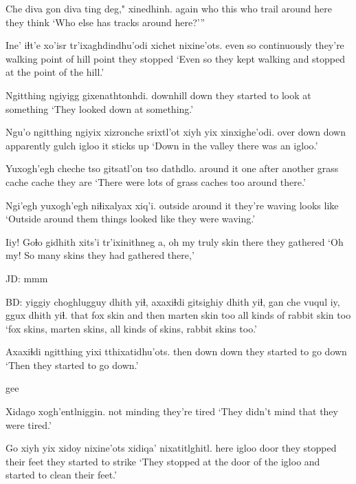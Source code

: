 \documentclass[12pt]{article}
\begin{document}
\gll Che   diva gon  diva ting  deg,"       xinedhinh.
again who  this who  trail {around here} {they think}
\glt `Who else has tracks around here?'''
\glend

\gll Ine'    iɬt'e        xo'isr   tr'ixaghdindhu'odi xichet nixine'ots.
{even so} continuously {they're walking} {point of hill}  point {they stopped}
\glt `Even so they kept walking and stopped at the point of the hill.'
\glend

\gll Ngitthing ngiyigg gixenathtonhdi.
downhill  down   {they started to look at something}
\glt `They looked down at something.'
\glend

\gll Ngu'o ngitthing ngiyix xizronche srixtl'ot {xiyh yix} xinxighe'odi.
over   down      down        apparently    gulch     igloo    {it sticks up}
\glt `Down in the valley there was an igloo.'
\glend

\gll Yuxogh'egh cheche tso   gitsatl'on tso   dathdlo.
{around it}  {one after another}  {grass cache} cache {they are}
\glt `There were lots of grass caches too around there.'
\glend

\gll Ngi'egh yuxogh'egh niɬixalyax     xiq'i.
outside {around it}  {they're waving} {looks like}
\glt `Outside around them things looked like they were waving.'
\glend

\gll Iiy! Goɬo  gidhith xits'i tr'ixinithneg a,
{oh my} truly skin           {there} {they gathered}
\glt  `Oh my! So many skins they had gathered there,'
\glend 

JD:  mmm

BD:  
\gll yiggiy choghlugguy dhith yiɬ, axaxiɬdi gitsighiy dhith yiɬ, {gan che vuqul iy,} ggux   dhith yiɬ. 
that   fox         skin  and then     marten    skin  too {all kinds of}      rabbit skin  too
\glt `fox skins, marten skins, all kinds of skins, rabbit skins too.'
\glend

\gll Axaxiɬdi ngitthing yixi tthixatidhu'ots.
then     down      down {they started to go down}
\glt `Then they started to go down.'
\glend

gee 

\gll Xidago      xogh'entlniggin.
{not minding} {they're tired}
\glt `They didn't mind that they were tired.'
\glend

\gll Go   {xiyh yix} xidoy nixine'ots xidiqa'    nixatitlghitl.
here igloo    door  {they stopped} {their feet} {they started to strike}
\glt `They stopped at the door of the igloo and started to clean their feet.'
\glend
\end{document}

